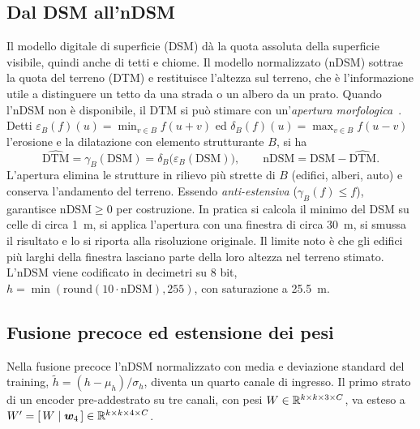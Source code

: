 \subsection{Dal DSM all'nDSM}

Il modello digitale di superficie (DSM) dà la quota assoluta della superficie visibile, quindi
anche di tetti e chiome. Il modello normalizzato (nDSM) sottrae la quota del terreno (DTM) e
restituisce l'altezza sul terreno, che è l'informazione utile a distinguere un tetto da una
strada o un albero da un prato. Quando l'nDSM non è disponibile, il DTM si può stimare con
un'\emph{apertura morfologica}~\cite{soille2003morphology}. Detti
$\varepsilon_B(f)(u)=\min_{v\in B}f(u+v)$ ed $\delta_B(f)(u)=\max_{v\in B}f(u-v)$ l'erosione e
la dilatazione con elemento strutturante $B$, si ha
\begin{equation}
  \widehat{\mathrm{DTM}}=\gamma_B(\mathrm{DSM})=\delta_B\bigl(\varepsilon_B(\mathrm{DSM})\bigr),
  \qquad
  \mathrm{nDSM}=\mathrm{DSM}-\widehat{\mathrm{DTM}} .
  \label{eq:apertura}
\end{equation}
L'apertura elimina le strutture in rilievo più strette di $B$ (edifici, alberi, auto) e conserva
l'andamento del terreno. Essendo \emph{anti-estensiva} ($\gamma_B(f)\le f$), garantisce
$\mathrm{nDSM}\ge0$ per costruzione. In pratica si calcola il minimo del DSM su celle di circa
\SI{1}{\meter}, si applica l'apertura con una finestra di circa \SI{30}{\meter}, si smussa il
risultato e lo si riporta alla risoluzione originale. Il limite noto è che gli edifici più larghi
della finestra lasciano parte della loro altezza nel terreno stimato. L'nDSM viene codificato in
decimetri su 8 bit, $h=\min(\mathrm{round}(10\cdot\mathrm{nDSM}),255)$, con saturazione a
\SI{25,5}{\meter}.

\subsection{Fusione precoce ed estensione dei pesi}

Nella fusione precoce l'nDSM normalizzato con media e deviazione standard del training,
$\tilde h=(h-\mu_h)/\sigma_h$, diventa un quarto canale di ingresso. Il primo strato di un
encoder pre-addestrato su tre canali, con pesi $W\in\mathbb{R}^{k\times k\times3\times C}$, va esteso a
$W'=[\,W\mid\bm{w}_4\,]\in\mathbb{R}^{k\times k\times4\times C}$.

